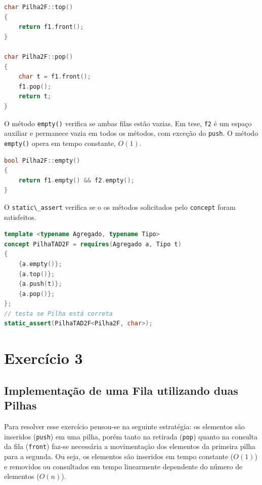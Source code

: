 \documentclass[
  brazilian,
  paper=a4,
  oneside  ,captions=tableheading
]{scrbook}
\newcommand{\passthrough}[1]{#1}
\begin{document}
\begin{lstlisting}[language={C++}]
char Pilha2F::top()
{
    return f1.front();
}

char Pilha2F::pop()
{
    char t = f1.front();
    f1.pop();
    return t;
}
\end{lstlisting}

O método \passthrough{\lstinline!empty()!} verifica se ambas filas estão
vazias. Em tese, \passthrough{\lstinline!f2!} é um espaço auxiliar e
permanece vazia em todos os métodos, com exceção do
\passthrough{\lstinline!push!}. O método
\passthrough{\lstinline!empty()!} opera em tempo constante, \(O(1)\).

\begin{lstlisting}[language={C++}]
bool Pilha2F::empty()
{
    return f1.empty() && f2.empty();
}
\end{lstlisting}

O \passthrough{\lstinline!static\_assert!} verifica se o os métodos
solicitados pelo \passthrough{\lstinline!concept!} foram satisfeitos.

\begin{lstlisting}[language={C++}]
template <typename Agregado, typename Tipo>
concept PilhaTAD2F = requires(Agregado a, Tipo t)
{
    {a.empty()};
    {a.top()};
    {a.push(t)};
    {a.pop()};
};
// testa se Pilha está correta
static_assert(PilhaTAD2F<Pilha2F, char>);
\end{lstlisting}

\hypertarget{exercuxedcio-3}{%
\chapter{Exercício 3}\label{exercuxedcio-3}}

\hypertarget{implementauxe7uxe3o-de-uma-fila-utilizando-duas-pilhas}{%
\section{Implementação de uma Fila utilizando duas
Pilhas}\label{implementauxe7uxe3o-de-uma-fila-utilizando-duas-pilhas}}

Para resolver esse exercício pensou-se na seguinte estratégia: os
elementos são inseridos (\passthrough{\lstinline!push!}) em uma pilha,
porém tanto na retirada (\passthrough{\lstinline!pop!}) quanto na
consulta da fila (\passthrough{\lstinline!front!}) faz-se necessária a
movimentação dos elementos da primeira pilha para a segunda. Ou seja, os
elementos são inseridos em tempo constante (\(O(1)\)) e removidos ou
consultados em tempo linearmente dependente do número de elementos
(\(O(n)\)).
\end{document}

